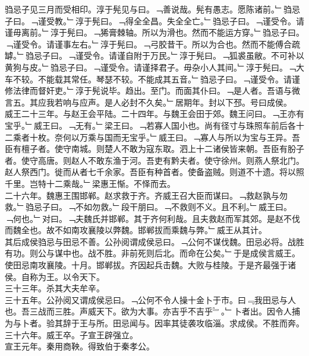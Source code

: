 \documentclass{zhvt-classic}
\begin{document}
\hspace*{2em}驺忌子见三月而受相印。淳于髡见与曰。﹁善说哉。髡有愚志。愿陈诸前。﹂驺忌子曰。﹁谨受教。﹂淳于髡曰。﹁得全全昌。失全全亡。﹂驺忌子曰。﹁谨受令。请谨毋离前。﹂淳于髡曰。﹁狶膏棘轴。所以为滑也。然而不能运方穿。﹂驺忌子曰。﹁谨受令。请谨事左右。﹂淳于髡曰。﹁弓胶昔干。所以为合也。然而不能傅合疏罅。﹂驺忌子曰。﹁谨受令。请谨自附于万民。﹂淳于髡曰。﹁狐裘虽敝。不可补以黄狗与皮。﹂驺忌子曰。﹁谨受令。请谨择君子。毋杂小人其间。﹂淳于髡曰。﹁大车不较。不能载其常任。琴瑟不较。不能成其五音。﹂驺忌子曰。﹁谨受令。请谨修法律而督奸吏。﹂淳于髡说毕。趋出。至门。而面其仆曰。﹁是人者。吾语与微言五。其应我若响与应声。是人必封不久矣。﹂居期年。封以下邳。号曰成侯。\\
\hspace*{2em}威王二十三年。与赵王会平陆。二十四年。与魏王会田于郊。魏王问曰。﹁王亦有宝乎。﹂威王曰。﹁无有。﹂梁王曰。﹁若寡人国小也。尚有径寸与珠照车前后各十二乘者十枚。奈何以万乘与国而无宝乎。﹂威王曰。﹁寡人与所以为宝与王异。吾臣有檀子者。使守南城。则楚人不敢为寇东取。泗上十二诸侯皆来朝。吾臣有朌子者。使守高唐。则赵人不敢东渔于河。吾吏有黔夫者。使守徐州。则燕人祭北门。赵人祭西门。徙而从者七千余家。吾臣有种首者。使备盗贼。则道不十遗。将以照千里。岂特十二乘哉。﹂梁惠王惭。不怿而去。\\
\hspace*{2em}二十六年。魏惠王围邯郸。赵求救于齐。齐威王召大臣而谋曰。﹁救赵孰与勿救。﹂驺忌子曰。﹁不如勿救。﹂段干朋曰。﹁不救则不义。且不利。﹂威王曰。﹁何也。﹂对曰。﹁夫魏氏并邯郸。其于齐何利哉。且夫救赵而军其郊。是赵不伐而魏全也。故不如南攻襄陵以弊魏。邯郸拔而乘魏与弊。﹂威王从其计。\\
\hspace*{2em}其后成侯驺忌与田忌不善。公孙阅谓成侯忌曰。﹁公何不谋伐魏。田忌必将。战胜有功。则公与谋中也。战不胜。非前死则后北。而命在公矣。﹂于是成侯言威王。使田忌南攻襄陵。十月。邯郸拔。齐因起兵击魏。大败与桂陵。于是齐最强于诸侯。自称为王。以令天下。\\
\hspace*{2em}三十三年。杀其大夫牟辛。\\
\hspace*{2em}三十五年。公孙阅又谓成侯忌曰。﹁公何不令人操十金卜于市。曰﹃我田忌与人也。吾三战而三胜。声威天下。欲为大事。亦吉乎不吉乎﹄。﹂卜者出。因令人捕为与卜者。验其辞于王与所。田忌闻与。因率其徒袭攻临淄。求成侯。不胜而奔。\\
\hspace*{2em}三十六年。威王卒。子宣王辟强立。\\
\hspace*{2em}宣王元年。秦用商鞅。得致伯于秦孝公。\\
\end{document}
